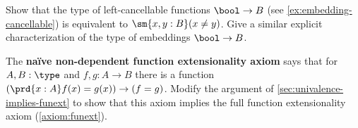 \begin{ex}\label{ex:cancellable-from-bool}
  Show that the type of left-cancellable functions $\bool\to B$ (see \cref{ex:embedding-cancellable}) is equivalent to $\sm{x,y:B}(x\neq y)$.
  Give a similar explicit characterization of the type of embeddings $\bool\to B$.
\end{ex}

\begin{ex}\label{ex:funext-from-nondep}
  The \textbf{na\"{i}ve non-dependent function extensionality axiom} says that for $A,B:\type$ and $f,g:A\to B$ there is a function $(\prd{x:A} f(x)=g(x)) \to (f=g)$.
  Modify the argument of \cref{sec:univalence-implies-funext} to show that this axiom implies the full function extensionality axiom (\cref{axiom:funext}).
\end{ex}


